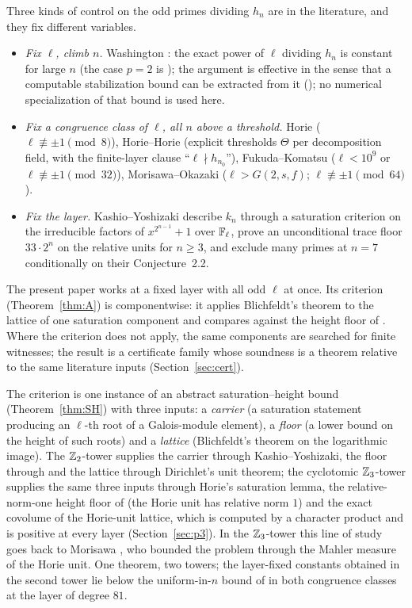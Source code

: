 \documentclass[11pt]{amsart}
\theoremstyle{remark}\newtheorem{remark}[theorem]{Remark}
\theoremstyle{definition}\newtheorem{definition}[theorem]{Definition}
\theoremstyle{definition}\newtheorem{algorithm}[theorem]{Algorithm}
\begin{document}
Three kinds of control on the odd primes dividing $h_n$ are in the literature, and they fix different variables.
\begin{itemize}
\item[(i)] \emph{Fix $\ell$, climb $n$.} Washington \cite{Wa75,Wa78}: the exact power of $\ell$ dividing $h_n$ is constant for large $n$ (the case $p=2$ is \cite{Wa75}); the argument is effective in the sense that a computable stabilization bound can be extracted from it (\cite{Wa78}); no numerical specialization of that bound is used here.
\item[(ii)] \emph{Fix a congruence class of $\ell$, all $n$ above a threshold.} Horie \cite{Ho05,Ho07} ($\ell\not\equiv\pm1\pmod 8$), Horie--Horie \cite{HH09} (explicit thresholds $\Theta$ per decomposition field, with the finite-layer clause ``$\ell\nmid h_{n_0}$''), Fukuda--Komatsu \cite{FK3} ($\ell<10^9$ or $\ell\not\equiv\pm1\pmod{32}$), Morisawa--Okazaki \cite{MO16} ($\ell>G(2,s,f)$; $\ell\not\equiv\pm1\pmod{64}$).
\item[(iii)] \emph{Fix the layer.} Kashio--Yoshizaki \cite{KY} describe $k_n$ through a saturation criterion on the irreducible factors of $x^{2^{n-1}}+1$ over $\mathbb{F}_\ell$, prove an unconditional trace floor $33\cdot2^n$ on the relative units for $n\ge3$, and exclude many primes at $n=7$ conditionally on their Conjecture~2.2.
\end{itemize}
The present paper works at a fixed layer with all odd $\ell$ at once. Its criterion (Theorem~\ref{thm:A}) is componentwise: it applies Blichfeldt's theorem \cite{Bl14} to the lattice of one saturation component and compares against the height floor of \cite{MO16}. Where the criterion does not apply, the same components are searched for finite witnesses; the result is a certificate family whose soundness is a theorem relative to the same literature inputs (Section~\ref{sec:cert}).

The criterion is one instance of an abstract saturation--height bound (Theorem~\ref{thm:SH}) with three inputs: a \emph{carrier} (a saturation statement producing an $\ell$-th root of a Galois-module element), a \emph{floor} (a lower bound on the height of such roots) and a \emph{lattice} (Blichfeldt's theorem on the logarithmic image). The $\mathbb{Z}_2$-tower supplies the carrier through Kashio--Yoshizaki, the floor through \cite{MO16} and the lattice through Dirichlet's unit theorem; the cyclotomic $\mathbb{Z}_3$-tower supplies the same three inputs through Horie's saturation lemma, the relative-norm-one height floor of \cite{MO16} (the Horie unit has relative norm $1$) and the exact covolume of the Horie-unit lattice, which is computed by a character product and is positive at every layer (Section~\ref{sec:p3}). In the $\mathbb{Z}_3$-tower this line of study goes back to Morisawa \cite{Mo12}, who bounded the problem through the Mahler measure of the Horie unit. One theorem, two towers; the layer-fixed constants obtained in the second tower lie below the uniform-in-$n$ bound of \cite{MO16} in both congruence classes at the layer of degree $81$.
\end{document}
